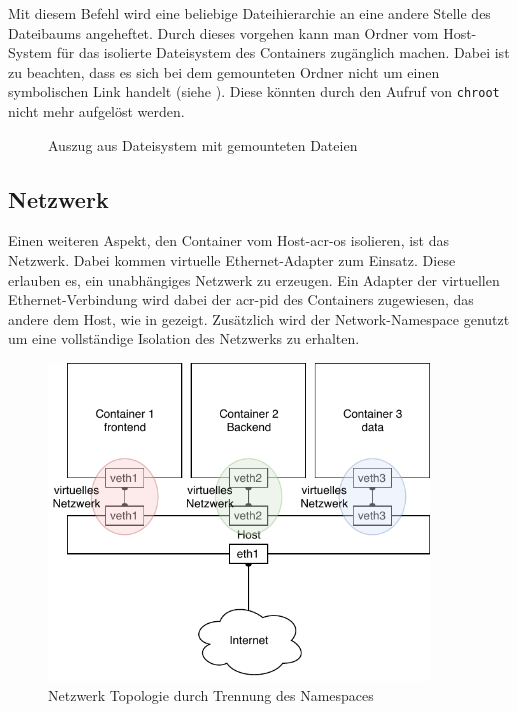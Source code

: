 Mit diesem Befehl wird eine beliebige Dateihierarchie an eine andere Stelle des Dateibaums angeheftet. Durch dieses vorgehen kann man Ordner vom Host-System  für das isolierte Dateisystem des Containers zugänglich machen. Dabei ist zu beachten, dass es sich bei dem gemounteten Ordner nicht um einen symbolischen Link handelt (siehe ). Diese könnten durch den Aufruf von \texttt{chroot} nicht mehr aufgelöst werden.

\begin{figure}[h]
	\centering
	\begin{minipage}{0.9\textwidth}
	\end{minipage}
	\caption{Auszug aus Dateisystem mit gemounteten Dateien}
	\label{fig:mountExample}
\end{figure}

\subsection{Netzwerk}
\label{sec:netzwerk}

Einen weiteren Aspekt, den Container vom Host-\gls{acr-os} isolieren, ist das Netzwerk. Dabei kommen virtuelle Ethernet-Adapter zum Einsatz. Diese erlauben es, ein unabhängiges Netzwerk zu erzeugen. Ein Adapter der virtuellen Ethernet-Verbindung wird dabei der \gls{acr-pid} des Containers zugewiesen, das andere dem Host, wie in  gezeigt. Zusätzlich wird der Network-Namespace genutzt um eine vollständige Isolation des Netzwerks zu erhalten.

\begin{figure}[h]
	\begin{center}
		\includegraphics[width=0.9\textwidth]{bilder/network-topology.pdf}
		\caption{Netzwerk Topologie durch Trennung des Namespaces}
		\label{fig:containerHostNetwork}
	\end{center}
\end{figure} 


